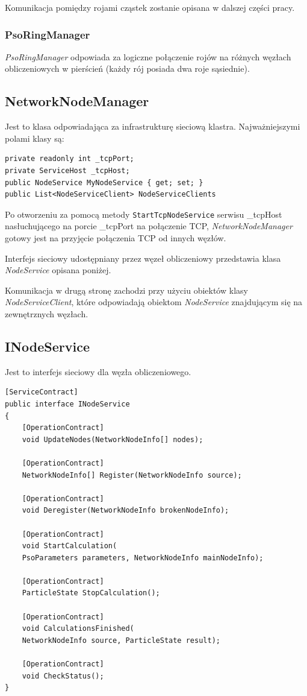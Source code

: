 \documentclass[12pt, twoside, openany, abstract=on]{report}
\theoremstyle{definition}
\begin{document}
Komunikacja pomiędzy rojami cząstek zostanie opisana w dalszej części pracy.

\subsubsection{PsoRingManager}
\textit{PsoRingManager} odpowiada za logiczne połączenie rojów na różnych węzłach obliczeniowych w pierścień (każdy rój posiada dwa roje sąsiednie).


\subsection{NetworkNodeManager}
Jest to klasa odpowiadająca za infrastrukturę sieciową klastra. Najważniejszymi polami klasy są:

\lstset{style=sharpc}
\begin{lstlisting}[frame=single]
private readonly int _tcpPort;
private ServiceHost _tcpHost;
public NodeService MyNodeService { get; set; }
public List<NodeServiceClient> NodeServiceClients
\end{lstlisting}

Po otworzeniu za pomocą metody \texttt{StartTcpNodeService} serwisu \_tcpHost nasłuchującego na porcie \_tcpPort na połączenie TCP, \textit{NetworkNodeManager} gotowy jest na przyjęcie połączenia TCP od innych węzłów. 

Interfejs sieciowy udostępniany przez węzeł obliczeniowy przedstawia klasa \textit{NodeService} opisana poniżej.

Komunikacja w drugą stronę zachodzi przy użyciu obiektów klasy \textit{NodeServiceClient}, które odpowiadają obiektom \textit{NodeService} znajdującym się na zewnętrznych węzłach.

\subsection{INodeService}
Jest to interfejs sieciowy dla węzła obliczeniowego.

\lstset{style=sharpc}
\begin{lstlisting}[frame=single]
[ServiceContract]
public interface INodeService
{
    [OperationContract] 
    void UpdateNodes(NetworkNodeInfo[] nodes);

    [OperationContract]
    NetworkNodeInfo[] Register(NetworkNodeInfo source);

    [OperationContract]
    void Deregister(NetworkNodeInfo brokenNodeInfo);

    [OperationContract]
    void StartCalculation(
    PsoParameters parameters, NetworkNodeInfo mainNodeInfo);

    [OperationContract]
    ParticleState StopCalculation();

    [OperationContract]
    void CalculationsFinished(
    NetworkNodeInfo source, ParticleState result);

    [OperationContract]
    void CheckStatus();
}
\end{lstlisting}
\end{document}
